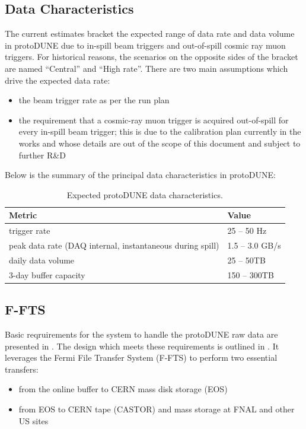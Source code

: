 \documentclass[pdftex,12pt,letter]{article}
\newcommand{\pd}{protoDUNE\xspace}
\begin{document}
\subsection{Data Characteristics}

The current estimates \cite{docdb1086} bracket the expected range of data rate
and data volume in \pd \cite{docdb186} due to in-spill beam triggers and out-of-spill cosmic ray muon triggers.
For historical reasons, the scenarios on the opposite sides of the bracket are named ``Central'' and ``High rate''.
There are two main assumptions which drive the expected data rate:
\begin{itemize}
\item the beam trigger rate as per the run plan
\item the requirement that a cosmic-ray muon trigger is acquired out-of-spill for every in-spill beam trigger; this is due to
the calibration plan currently in the works and whose details are out of the scope of this document and subject to
further R\&D
\end{itemize}
\noindent Below is the summary of the principal data characteristics in \pd:
\begin{table}[tbh]
\centering
\begin{tabular}{l l}
\hline
\textbf{Metric} & \textbf{Value} \\
\hline
\hline
trigger rate				& 25 -- 50 Hz \\
peak data rate (DAQ internal, instantaneous during spill)	& 1.5 -- 3.0 GB/s \\
daily data volume &  25 -- 50TB \\
3-day buffer capacity & 150 -- 300TB \\
\hline
\end{tabular}
\caption{\label{tab:data_char}Expected protoDUNE data characteristics.}
\end{table}

\subsection{F-FTS}
Basic reqruirements for the system to handle the \pd raw data are presented in \cite{docdb1209}.
The design which meets these requirements is outlined in \cite{docdb1212}. It leverages the
Fermi File Transfer System (F-FTS) to perform two essential transfers:
\begin{itemize}
\item from the online buffer to CERN mass disk storage (EOS)
\item from EOS to CERN tape (CASTOR) and  mass storage at FNAL and other US sites
\end{itemize}
\end{document}
